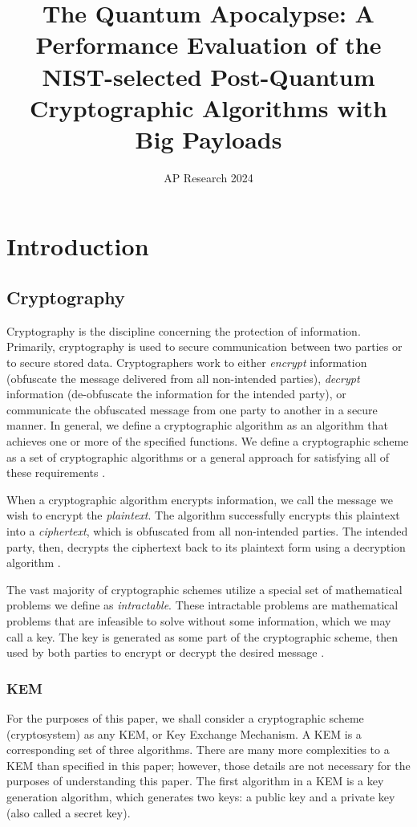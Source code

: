 \documentclass[a4paper]{article}
\begin{document}
  \title{The Quantum Apocalypse: A Performance Evaluation of the
  NIST-selected Post-Quantum Cryptographic Algorithms with Big
  Payloads}
  \author{AP Research 2024}
  \maketitle

\section{Introduction}

\subsection{Cryptography}

Cryptography is the discipline concerning the protection of information.
Primarily, cryptography is used to secure communication between two
parties or to secure stored data. Cryptographers work to either
\emph{encrypt} information (obfuscate the message delivered from all
non-intended parties), \emph{decrypt} information (de-obfuscate the
information for the intended party), or communicate the obfuscated
message from one party to another in a secure manner. In general, we
define a cryptographic algorithm as an algorithm that achieves one or
more of the specified functions. We define a cryptographic scheme as a
set of cryptographic algorithms or a general approach for satisfying all
of these requirements \autocite{schneierAppliedCryptographyProtocols1996}.

When a cryptographic algorithm encrypts information, we call the message
we wish to encrypt the \emph{plaintext}. The algorithm successfully
encrypts this plaintext into a \emph{ciphertext}, which is obfuscated
from all non-intended parties. The intended party, then, decrypts the
ciphertext back to its plaintext form using a decryption algorithm
\autocite{lamCryptographyComputationalNumber2001}.

The vast majority of cryptographic schemes utilize a special set of
mathematical problems we define as \emph{intractable}. These intractable
problems are mathematical problems that are infeasible to solve without
some information, which we may call a key. The key is generated as some
part of the cryptographic scheme, then used by both parties to encrypt
or decrypt the desired message
\autocite{lamCryptographyComputationalNumber2001}.

\subsubsection[kem]{KEM}
For the
purposes of this paper, we shall consider a cryptographic scheme
(cryptosystem) as any KEM, or Key Exchange Mechanism. A KEM is a
corresponding set of three algorithms. There are many more complexities
to a KEM than specified in this paper; however, those details are not
necessary for the purposes of understanding this paper. The first
algorithm in a KEM is a key generation algorithm, which generates two
keys: a public key and a private key (also called a secret key).
\end{document}
